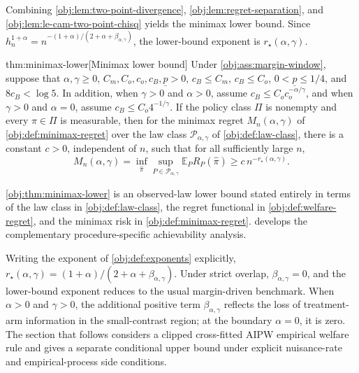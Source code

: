 Combining \cref{obj:lem:two-point-divergence}, \cref{obj:lem:regret-separation}, and \cref{obj:lem:le-cam-two-point-chisq} yields the minimax lower bound.  Since \(h_n^{1+\alpha}=n^{-(1+\alpha)/(2+\alpha+\beta_{\alpha,\gamma})}\), the lower-bound exponent is \(r_\star(\alpha,\gamma)\).

\begin{theoremv}{thm:minimax-lower}[Minimax lower bound]
Under \cref{obj:ass:margin-window}, suppose that \(\alpha,\gamma\ge0\), \(C_m,C_o,c_o,c_B,\underline p>0\), \(c_B\le C_m\), \(c_B\le C_o\), \(0<\underline p\le 1/4\), and \(8c_B<\log 5\).  In addition, when \(\gamma>0\) and \(\alpha>0\), assume \(c_B\le C_o c_o^{-\alpha/\gamma}\), and when \(\gamma>0\) and \(\alpha=0\), assume \(c_B\le C_o 4^{-1/\gamma}\).  If the policy class \(\Pi\) is nonempty and every \(\pi\in\Pi\) is measurable, then for the minimax regret \(M_n(\alpha,\gamma)\) of \cref{obj:def:minimax-regret} over the law class \(\mathcal P_{\alpha,\gamma}\) of \cref{obj:def:law-class}, there is a constant \(c>0\), independent of \(n\), such that for all sufficiently large \(n\),
\[
M_n(\alpha,\gamma)
=
\inf_{\widehat\pi}
\sup_{P\in\mathcal P_{\alpha,\gamma}}
\mathbb E_P R_P(\widehat\pi)
\ge
c\,n^{-r_\star(\alpha,\gamma)}.
\]
\end{theoremv}

\cref{obj:thm:minimax-lower} is an observed-law lower bound stated entirely in terms of the law class in \cref{obj:def:law-class}, the regret functional in \cref{obj:def:welfare-regret}, and the minimax risk in \cref{obj:def:minimax-regret}.   develops the complementary procedure-specific achievability analysis.

Writing the exponent of \cref{obj:def:exponents} explicitly, \(r_\star(\alpha,\gamma)=(1+\alpha)/(2+\alpha+\beta_{\alpha,\gamma})\).  Under strict overlap, \(\beta_{\alpha,\gamma}=0\), and the lower-bound exponent reduces to the usual margin-driven benchmark.  When \(\alpha>0\) and \(\gamma>0\), the additional positive term \(\beta_{\alpha,\gamma}\) reflects the loss of treatment-arm information in the small-contrast region; at the boundary \(\alpha=0\), it is zero.  The section that follows considers a clipped cross-fitted AIPW empirical welfare rule and gives a separate conditional upper bound under explicit nuisance-rate and empirical-process side conditions.
